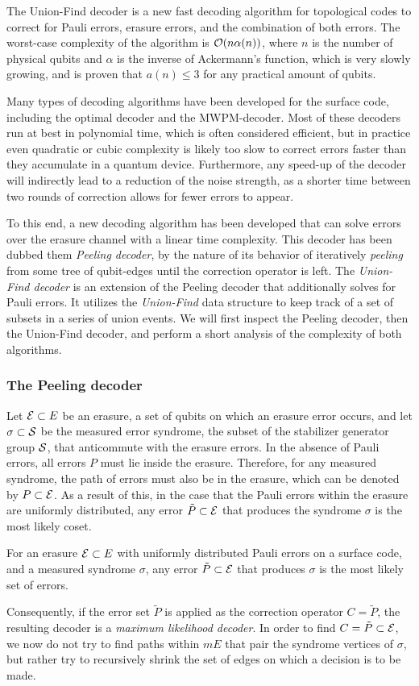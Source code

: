 The Union-Find decoder is a new fast decoding algorithm for topological codes to correct for Pauli errors, erasure errors, and the combination of both errors. The worst-case complexity of the algorithm is $\mathcal{O}(n\alpha(n))$, where $n$ is the number of physical qubits and $\alpha$ is the inverse of Ackermann's function, which is very slowly growing, and is proven that $a(n)\leq 3$ for any practical amount of qubits.

Many types of decoding algorithms have been developed for the surface code, including the optimal decoder and the MWPM-decoder. Most of these decoders run at best in polynomial time, which is often considered efficient, but in practice even quadratic or cubic complexity is likely too slow to correct errors faster than they accumulate in a quantum device. Furthermore, any speed-up of the decoder will indirectly lead to a reduction of the noise strength, as a shorter time between two rounds of correction allows for fewer errors to appear. 

To this end, a new decoding algorithm has been developed that can solve errors over the erasure channel with a linear time complexity. This decoder has been dubbed them \emph{Peeling decoder}, by the nature of its behavior of iteratively \emph{peeling} from some tree of qubit-edges until the correction operator is left. The \emph{Union-Find decoder} is an extension of the Peeling decoder that additionally solves for Pauli errors. It utilizes the \emph{Union-Find} data structure to keep track of a set of subsets in a series of union events. We will first inspect the Peeling decoder, then the Union-Find decoder, and perform a short analysis of the complexity of both algorithms. 

\subsubsection{The Peeling decoder}
Let $\mathcal{E}\subset E$ be an erasure, a set of qubits on which an erasure error occurs, and let $\sigma \subset \mathcal{S}$ be the measured error syndrome, the subset of the stabilizer generator group $\mathcal{S}$, that anticommute with the erasure errors. In the absence of Pauli errors, all errors $P$ must lie inside the erasure. Therefore, for any measured syndrome, the path of errors must also be in the erasure, which can be denoted by $P\subset \mathcal{E}$. As a result of this, in the case that the Pauli errors within the erasure are uniformly distributed, any error $\tilde{P}\subset\mathcal{E}$ that produces the syndrome $\sigma$ is the most likely coset. 
\begin{lemma}\label{lem:peelinguni}
  For an erasure $\mathcal{E} \subset E$ with uniformly distributed Pauli errors on a surface code, and a measured syndrome $\sigma$, any error $\tilde{P}\subset \mathcal{E}$ that produces $\sigma$ is the most likely set of errors. 
\end{lemma}
Consequently, if the error set $\tilde{P}$ is applied as the correction operator $C=\tilde{P}$, the resulting decoder is a \emph{maximum likelihood decoder}. In order to find $C=\tilde{P} \subset \mathcal{E}$, we now do not try to find paths within $m{E}$ that pair the syndrome vertices of $\sigma$, but rather try to recursively shrink the set of edges on which a decision is to be made. 

